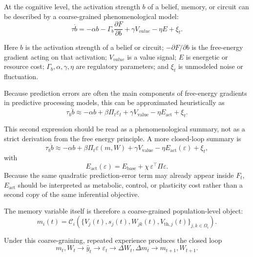 \documentclass[11pt, a4paper]{article}
\begin{document}
At the cognitive level, the activation strength $b$ of a belief, memory, or circuit can be described by a coarse-grained phenomenological model:
\begin{equation}
\tau \dot b
=
-\alpha b
-
\Gamma_b\frac{\partial F}{\partial b}
+
\gamma V_{value}
-
\eta E
+
\xi_t.
\end{equation}

Here $b$ is the activation strength of a belief or circuit; $-\partial F/\partial b$ is the free-energy gradient acting on that activation; $V_{value}$ is a value signal; $E$ is energetic or resource cost; $\Gamma_b,\alpha,\gamma,\eta$ are regulatory parameters; and $\xi_t$ is unmodeled noise or fluctuation.

Because prediction errors are often the main components of free-energy gradients in predictive processing models, this can be approximated heuristically as
\begin{equation}
\tau_b \dot b
\approx
-\alpha b
+
\beta \Pi_t\varepsilon_t
+
\gamma V_{\mathrm{value}}
-
\eta E_{\mathrm{act}}
+
\xi_t.
\end{equation}

This second expression should be read as a phenomenological summary, not as a strict derivation from the free energy principle. A more closed-loop summary is
\begin{equation}
\tau_b\dot b
\approx
-\alpha b
+
\beta\Pi_t\varepsilon(m,W)
+
\gamma V_{\mathrm{value}}
-
\eta E_{\mathrm{act}}(\varepsilon)
+
\xi_t,
\end{equation}
with
\begin{equation}
E_{\mathrm{act}}(\varepsilon)
=
E_{\mathrm{base}}
+
\chi\,\varepsilon^\top\Pi\varepsilon.
\end{equation}
Because the same quadratic prediction-error term may already appear inside $F_t$, $E_{\mathrm{act}}$ should be interpreted as metabolic, control, or plasticity cost rather than a second copy of the same inferential objective.

The memory variable itself is therefore a coarse-grained population-level object:
\begin{equation}
m_i(t)
=
\mathcal C_i\left(
\{V_j(t),s_j(t),W_{jk}(t),V_{\mathrm{th},j}(t)\}_{j,k\in\Omega_i}
\right).
\end{equation}

Under this coarse-graining, repeated experience produces the closed loop
\begin{equation}
m_t,W_t
\rightarrow
\hat y_t
\rightarrow
\varepsilon_t
\rightarrow
\Delta W_t,\Delta m_t
\rightarrow
m_{t+1},W_{t+1}.
\end{equation}
\end{document}
